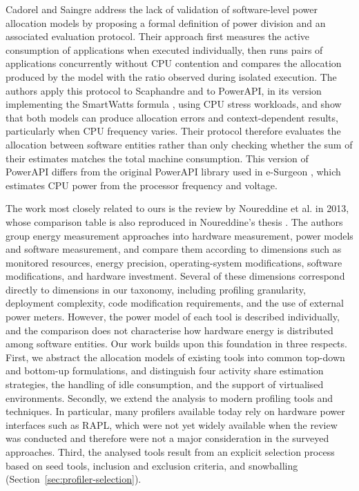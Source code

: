 \documentclass[
  acmsmall,
  screen,
  review,
  xcolor={dvipsnames,usenames}
]{acmart}
\begin{document}
Cadorel and Saingre \cite{cadorelProtocolAssessAccuracy2024b} address the lack of validation of software-level power allocation models by proposing a formal definition of power division and an associated evaluation protocol. Their approach first measures the active consumption of applications when executed individually, then runs pairs of applications concurrently without CPU contention and compares the allocation produced by the model with the ratio observed during isolated execution. The authors apply this protocol to Scaphandre and to PowerAPI, in its version implementing the SmartWatts formula \cite{fieniSmartWattsSelfCalibratingSoftwareDefined2020,fieniPowerAPIPythonFramework2024}, using CPU stress workloads, and show that both models can produce allocation errors and context-dependent results, particularly when CPU frequency varies. Their protocol therefore evaluates the allocation between software entities rather than only checking whether the sum of their estimates matches the total machine consumption. This version of PowerAPI differs from the original PowerAPI library used in e-Surgeon \cite{noureddineMonitoringEnergyHotspots2015}, which estimates CPU power from the processor frequency and voltage.

The work most closely related to ours is the review by Noureddine et al. \cite{noureddineReviewEnergyMeasurement2013} in 2013, whose comparison table is also reproduced in Noureddine's thesis \cite{noureddineBetterUnderstandingEnergy2014}. The authors group energy measurement approaches into hardware measurement, power models and software measurement, and compare them according to dimensions such as monitored resources, energy precision, operating-system modifications, software modifications, and hardware investment. Several of these dimensions correspond directly to dimensions in our taxonomy, including profiling granularity, deployment complexity, code modification requirements, and the use of external power meters. However, the power model of each tool is described individually, and the comparison does not characterise how hardware energy is distributed among software entities. Our work builds upon this foundation in three respects. First, we abstract the allocation models of existing tools into common top-down and bottom-up formulations, and distinguish four activity share estimation strategies, the handling of idle consumption, and the support of virtualised environments. Secondly, we extend the analysis to modern profiling tools and techniques. In particular, many profilers available today rely on hardware power interfaces such as RAPL, which were not yet widely available when the review was conducted and therefore were not a major consideration in the surveyed approaches. Third, the analysed tools result from an explicit selection process based on seed tools, inclusion and exclusion criteria, and snowballing (Section~\ref{sec:profiler-selection}).
\end{document}
